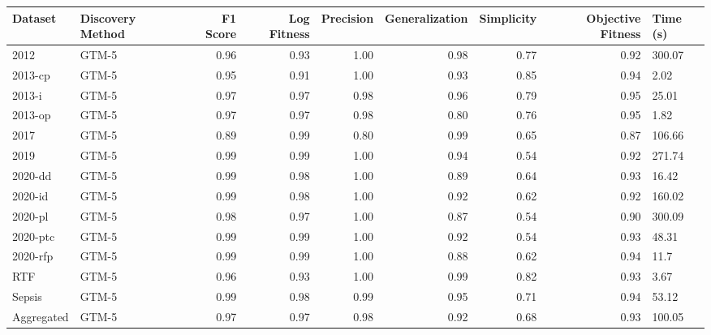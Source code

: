 \begin{tabular}{llrrrrrrl}
\toprule
Dataset & Discovery Method & F1 Score & Log Fitness & Precision & Generalization & Simplicity & Objective Fitness & Time (s) \\
\midrule
2012 & GTM-5 & 0.96 & 0.93 & 1.00 & 0.98 & 0.77 & 0.92 & 300.07 \\
2013-cp & GTM-5 & 0.95 & 0.91 & 1.00 & 0.93 & 0.85 & 0.94 & 2.02 \\
2013-i & GTM-5 & 0.97 & 0.97 & 0.98 & 0.96 & 0.79 & 0.95 & 25.01 \\
2013-op & GTM-5 & 0.97 & 0.97 & 0.98 & 0.80 & 0.76 & 0.95 & 1.82 \\
2017 & GTM-5 & 0.89 & 0.99 & 0.80 & 0.99 & 0.65 & 0.87 & 106.66 \\
2019 & GTM-5 & 0.99 & 0.99 & 1.00 & 0.94 & 0.54 & 0.92 & 271.74 \\
2020-dd & GTM-5 & 0.99 & 0.98 & 1.00 & 0.89 & 0.64 & 0.93 & 16.42 \\
2020-id & GTM-5 & 0.99 & 0.98 & 1.00 & 0.92 & 0.62 & 0.92 & 160.02 \\
2020-pl & GTM-5 & 0.98 & 0.97 & 1.00 & 0.87 & 0.54 & 0.90 & 300.09 \\
2020-ptc & GTM-5 & 0.99 & 0.99 & 1.00 & 0.92 & 0.54 & 0.93 & 48.31 \\
2020-rfp & GTM-5 & 0.99 & 0.99 & 1.00 & 0.88 & 0.62 & 0.94 & 11.7 \\
RTF & GTM-5 & 0.96 & 0.93 & 1.00 & 0.99 & 0.82 & 0.93 & 3.67 \\
Sepsis & GTM-5 & 0.99 & 0.98 & 0.99 & 0.95 & 0.71 & 0.94 & 53.12 \\
Aggregated & GTM-5 & 0.97 & 0.97 & 0.98 & 0.92 & 0.68 & 0.93 & 100.05 \\
\bottomrule
\end{tabular}
